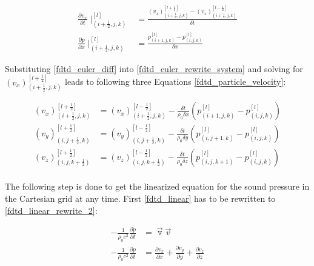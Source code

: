 \begin{subequations}\label{fdtd_euler_diff}
\begin{alignat}{2}
\frac{\partial v_x}{\partial t}\mid _{(i+\frac{1}{2},j,k)}^{[l]} &= \frac{(v_x)_{(i+\frac{1}{2},j,k)}^{[l+\frac{1}{2}]} -(v_x)_{(i+\frac{1}{2},j,k)}^{[l-\frac{1}{2}]}}{\delta t} \label{fdtd_euler_diff_1} \\
\frac{\partial p}{\partial x}\mid _{(i+\frac{1}{2},j,k)}^{[l]} &= \frac{p_{(i+1,j,k)}^{[l]} -p_{(i,j,k)}^{[l]}}{\delta x}  \label{fdtd_linear_diff_2}
\end{alignat}
\end{subequations}

Substituting \autoref{fdtd_euler_diff} into \autoref{fdtd_euler_rewrite_system} and solving for $(v_x)_{(i+\frac{1}{2},j,k)}^{[l+\frac{1}{2}]}$ leads to following three Equations \ref{fdtd_particle_velocity}:


\begin{subequations}\label{fdtd_particle_velocity}
\begin{alignat}{2}
(v_x)_{(i+\frac{1}{2},j,k)}^{[l+\frac{1}{2}]}&= (v_x)_{(i+\frac{1}{2},j,k)}^{[l-\frac{1}{2}]}-\frac{\delta t}{\rho_0 \delta x} \left( p_{(i+1,j,k)}^{[l]} -p_{(i,j,k)}^{[l]}  \right)\\
(v_y)_{(i,j+\frac{1}{2},k)}^{[l+\frac{1}{2}]}&= (v_y)_{(i,j+\frac{1}{2},k)}^{[l-\frac{1}{2}]}-\frac{\delta t}{\rho_0 \delta y} \left( p_{(i,j+1,k)}^{[l]} -p_{(i,j,k)}^{[l]}  \right)\\
(v_z)_{(i,j,k+\frac{1}{2})}^{[l+\frac{1}{2}]}&= (v_z)_{(i,j,k+\frac{1}{2})}^{[l-\frac{1}{2}]}-\frac{\delta t}{\rho_0 \delta z} \left( p_{(i,j,k+1)}^{[l]} -p_{(i,j,k)}^{[l]}  \right)
\end{alignat}
\end{subequations}
\\

The following step is done to get the linearized equation for the sound pressure in the Cartesian grid at any time. First \autoref{fdtd_linear} has to be rewritten to \autoref{fdtd_linear_rewrite_2}:

\begin{subequations}\label{fdtd_linear_rewrite}
\begin{alignat}{2}
- \frac{1}{\rho_0c^2} \frac{\partial p}{\partial t} &=\vec{\triangledown }\vec{v} \label{fdtd_linear_rewrite_1}\\
- \frac{1}{\rho_0c^2} \frac{\partial p}{\partial t} &=\frac{\partial v_x}{\partial x}+\frac{\partial v_y}{\partial y}+\frac{\partial v_z}{\partial z}\label{fdtd_linear_rewrite_2}
\end{alignat}
\end{subequations}
\\


